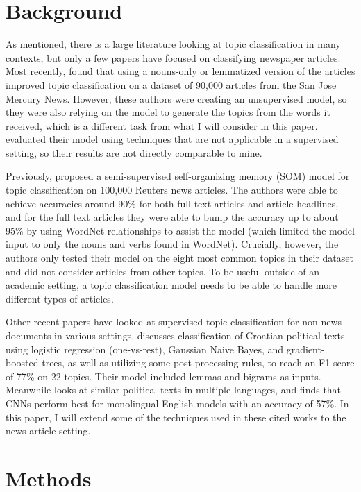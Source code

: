 \documentclass[11pt,a4paper,table]{article}
\begin{document}
\section{Background}
\label{sec:back}

As mentioned, there is a large literature looking at topic classification in many contexts, but only a few papers have focused on classifying newspaper articles. Most recently, \citet{Martin:15} found that using a nouns-only or lemmatized version of the articles improved topic classification on a dataset of 90,000 articles from the San Jose Mercury News. However, these authors were creating an unsupervised model, so they were also relying on the model to generate the topics from the words it received, which is a different task from what I will consider in this paper. \citeauthor{Martin:15} evaluated their model using techniques that are not applicable in a supervised setting, so their results are not directly comparable to mine.

Previously, \citet{Wermter:02} proposed a semi-supervised self-organizing memory (SOM) model for topic classification on 100,000 Reuters news articles. The authors were able to achieve accuracies around 90\% for both full text articles and article headlines, and for the full text articles they were able to bump the accuracy up to about 95\% by using WordNet relationships to assist the model (which limited the model input to only the nouns and verbs found in WordNet). Crucially, however, the authors only tested their model on the eight most common topics in their dataset and did not consider articles from other topics. To be useful outside of an academic setting, a topic classification model needs to be able to handle more different types of articles.

Other recent papers have looked at supervised topic classification for non-news documents in various settings. \citet{Karan:16} discusses classification of Croatian political texts using logistic regression (one-vs-rest), Gaussian Naive Bayes, and gradient-boosted trees, as well as utilizing some post-processing rules, to reach an F1 score of 77\% on 22 topics. Their model included lemmas and bigrams as inputs. Meanwhile \citet{Glavas:17} looks at similar political texts in multiple languages, and finds that CNNs perform best for monolingual English models with an accuracy of 57\%. In this paper, I will extend some of the techniques used in these cited works to the news article setting.

\section{Methods}
\label{sec:methods}
\end{document}
